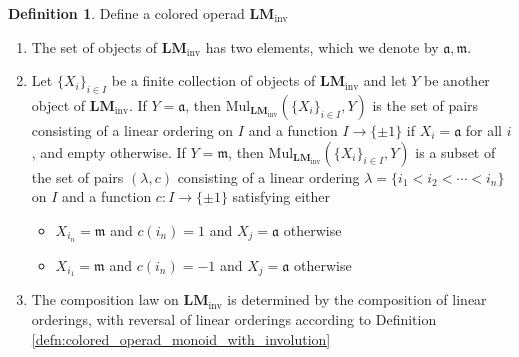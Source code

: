 \documentclass{article}
\theoremstyle{definition}
\newtheorem{definition}[theorem]{Definition}
\begin{document}
\begin{definition}\label{defn:inv_leftmod_operad}
    Define a colored operad $ \mathbf{LM}_\mathrm{inv} $
    \begin{enumerate}[label=(\roman*)]
        \item The set of objects of $ \mathbf{LM}_\mathrm{inv} $ has two elements, which we denote by $ \mathfrak{a}, \mathfrak{m} $. 
        \item Let $ \{X_i\}_{i \in I} $ be a finite collection of objects of $ \mathbf{LM}_{\mathrm{inv}} $ and let $ Y $ be another object of $ \mathbf{LM}_{\mathrm{inv}} $. 
        If $ Y = \mathfrak{a} $, then $ \mathrm{Mul}_{\mathbf{LM}_\mathrm{inv}} \left(\{X_i\}_{i \in I}, Y\right) $ is the set of pairs consisting of a linear ordering on $ I $ and a function $ I \to \{\pm 1\} $ if $ X_i = \mathfrak{a} $ for all $ i $, and empty otherwise. 
        If $ Y = \mathfrak{m} $, then $ \mathrm{Mul}_{\mathbf{LM}_\mathrm{inv}} \left(\{X_i\}_{i \in I}, Y\right) $ is a subset of the set of pairs $ (\lambda, c) $ consisting of a linear ordering $ \lambda = \{i_1 < i_2 < \cdots < i_n\} $ on $ I $ and a function $ c\colon I \to \{\pm 1 \} $ satisfying either 
        \begin{itemize}
            \item  $ X_{i_n} = \mathfrak{m} $ and $ c(i_n) = 1 $ and $ X_{j} = \mathfrak{a} $ otherwise
            \item  $ X_{i_1} = \mathfrak{m} $ and $ c(i_n) = -1 $ and $ X_{j} = \mathfrak{a} $ otherwise
        \end{itemize}
        \item The composition law on $ \mathbf{LM}_{\mathrm{inv}} $ is determined by the composition of linear orderings, with reversal of linear orderings according to Definition \ref{defn:colored_operad_monoid_with_involution} 
    \end{enumerate}
\end{definition} 
\end{document}
